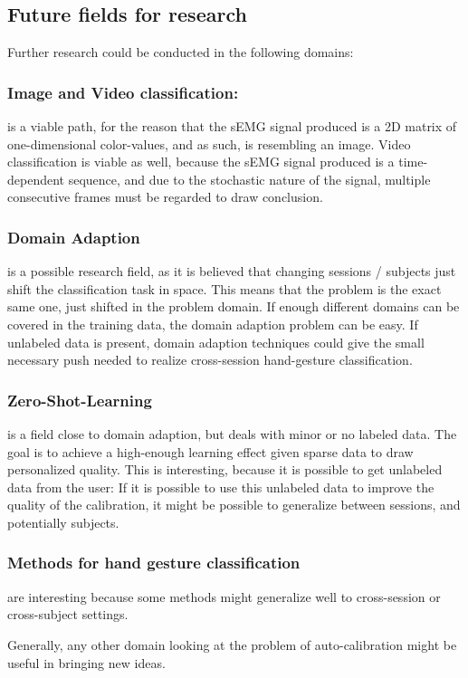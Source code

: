 \documentclass{article}
\begin{document}
\subsection{Future fields for research}
Further research could be conducted in the following domains:
\subsubsection{Image and Video classification: } is a viable path, for the reason that the sEMG signal produced is a 2D matrix of one-dimensional color-values, and as such, is resembling an image. Video classification is viable as well, because the sEMG signal produced is a time-dependent sequence, and due to the stochastic nature of the signal, multiple consecutive frames must be regarded to draw conclusion.
\subsubsection{Domain Adaption} is a possible research field, as it is believed that changing sessions / subjects just shift the classification task in space. This means that the problem is the exact same one, just shifted in the problem domain. If enough different domains can be covered in the training data, the domain adaption problem can be easy. If unlabeled data is present, domain adaption techniques could give the small necessary push needed to realize cross-session hand-gesture classification.
\subsubsection{Zero-Shot-Learning} is a field close to domain adaption, but deals with minor or no labeled data. The goal is to achieve a high-enough learning effect given sparse data to draw personalized quality. This is interesting, because it is possible to get unlabeled data from the user: If it is possible to use this unlabeled data to improve the quality of the calibration, it might be possible to generalize between sessions, and potentially subjects.
\subsubsection{Methods for hand gesture classification} are interesting because some methods might generalize well to cross-session or cross-subject settings.

Generally, any other domain looking at the problem of auto-calibration might be useful in bringing new ideas.
\end{document}
